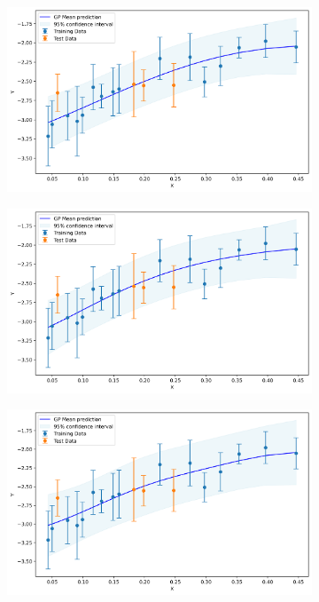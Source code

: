\documentclass[11pt]{article}
\begin{document}
\begin{figure}[H]
    \centering
    \begin{subfigure}[b]{0.3\textwidth}
        \centering
        \includegraphics[width=\textwidth]{LatexPlots/1dplots/MCMCmeangpr.png}
    \end{subfigure}
    \hfill
    \begin{subfigure}[b]{0.3\textwidth}
        \centering
        \includegraphics[width=\textwidth]{LatexPlots/1dplots/MCMCpeakgpr.png}
    \end{subfigure}
    \hfill
    \begin{subfigure}[b]{0.3\textwidth}
        \centering
        \includegraphics[width=\textwidth]{LatexPlots/1dplots/MCMCaveragegpr.png}

\end{subfigure}
\end{figure}
\end{document}
